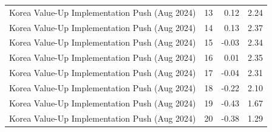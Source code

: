 \begin{table}
\begin{tabular}{lrrr}
Korea Value-Up Implementation Push (Aug 2024) & 13 & 0.12 & 2.24 \\
Korea Value-Up Implementation Push (Aug 2024) & 14 & 0.13 & 2.37 \\
Korea Value-Up Implementation Push (Aug 2024) & 15 & -0.03 & 2.34 \\
Korea Value-Up Implementation Push (Aug 2024) & 16 & 0.01 & 2.35 \\
Korea Value-Up Implementation Push (Aug 2024) & 17 & -0.04 & 2.31 \\
Korea Value-Up Implementation Push (Aug 2024) & 18 & -0.22 & 2.10 \\
Korea Value-Up Implementation Push (Aug 2024) & 19 & -0.43 & 1.67 \\
Korea Value-Up Implementation Push (Aug 2024) & 20 & -0.38 & 1.29 \\
\bottomrule
\end{tabular}
\end{table}
